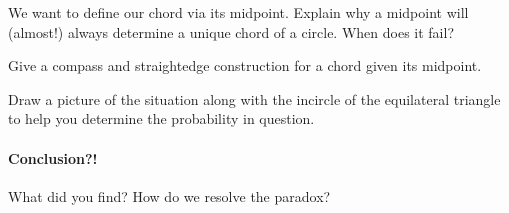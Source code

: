 \begin{prob}
We want to define our chord via its midpoint. Explain why a midpoint
will (almost!) always determine a unique chord of a circle. When does
it fail? 
\end{prob}

\begin{prob}
Give a compass and straightedge construction for a chord given its
midpoint.
\end{prob}

\begin{prob}
Draw a picture of the situation along with the incircle of the
equilateral triangle to help you determine the probability in
question.
\end{prob}



\paragraph{Conclusion?!}

\begin{prob}
What did you find? How do we resolve the paradox?
\end{prob}
